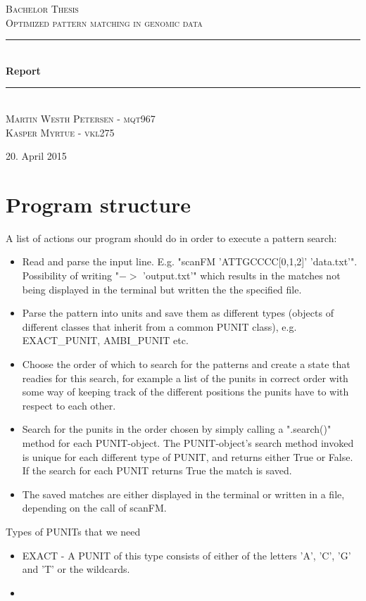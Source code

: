 \documentclass[12pt]{article}
\newcommand{\HRule}{\rule{\linewidth}{0.5mm}}
\begin{document}
\begin{titlepage}
\begin{center}

\textsc{\Large Bachelor Thesis \\ Optimized pattern matching in genomic data\\[0.3cm]}
\HRule \\[0.4cm]
{ \LARGE \bfseries Report}\\[0.4cm]
\HRule \\[1.2cm]
\textsc{\large Martin Westh Petersen - mqt967 \\ Kasper Myrtue - vkl275}\\[1.0cm]
\end{center}
\begin{center}
\vfill
{\large 20. April 2015}
\end{center}
\end{titlepage}
\tableofcontents
\section{Program structure}
A list of actions our program should do in order to execute a pattern search:
\begin{itemize}
\item Read and parse the input line. E.g. "scanFM 'ATTGCCCC[0,1,2]' 'data.txt'". Possibility of writing "$->$ 'output.txt'"
which results in the matches not being displayed in the terminal but written the the specified file.
\item Parse the pattern into units and save them as different types (objects of different classes that inherit
from a common PUNIT class), e.g. EXACT\_PUNIT, AMBI\_PUNIT etc.
\item Choose the order of which to search for the patterns and create a state that readies for this search, for example a 
list of the punits in correct order with some way of keeping track of the different positions the punits have to with
respect to each other.
\item Search for the punits in the order chosen by simply calling a ".search()" method for each PUNIT-object.
The PUNIT-object's search method invoked is unique for each different type of PUNIT, and returns either True or False.
If the search for each PUNIT returns True the match is saved.
\item The saved matches are either displayed in the terminal or written in a file, depending on the call of scanFM. 
\end{itemize}
Types of PUNITs that we need
\begin{itemize}
\item EXACT - A PUNIT of this type consists of either of the letters 'A', 'C', 'G' and 'T' or the wildcards.
\item  
\end{itemize}
\end{document}
